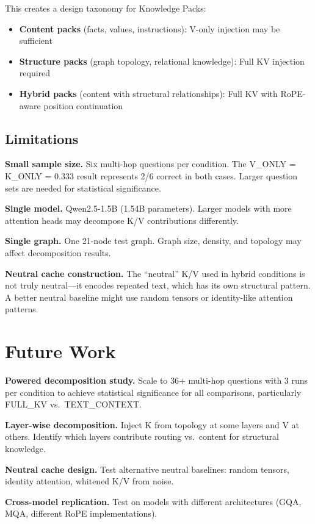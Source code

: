 \documentclass[11pt,a4paper]{article}
\begin{document}
This creates a design taxonomy for Knowledge Packs:
\begin{itemize}
    \item \textbf{Content packs} (facts, values, instructions): V-only injection may be sufficient
    \item \textbf{Structure packs} (graph topology, relational knowledge): Full KV injection required
    \item \textbf{Hybrid packs} (content with structural relationships): Full KV with RoPE-aware position continuation
\end{itemize}

\subsection{Limitations}

\textbf{Small sample size.} Six multi-hop questions per condition. The V\_ONLY = K\_ONLY = 0.333 result represents 2/6 correct in both cases. Larger question sets are needed for statistical significance.

\textbf{Single model.} Qwen2.5-1.5B (1.54B parameters). Larger models with more attention heads may decompose K/V contributions differently.

\textbf{Single graph.} One 21-node test graph. Graph size, density, and topology may affect decomposition results.

\textbf{Neutral cache construction.} The ``neutral'' K/V used in hybrid conditions is not truly neutral---it encodes repeated text, which has its own structural pattern. A better neutral baseline might use random tensors or identity-like attention patterns.

\section{Future Work}

\textbf{Powered decomposition study.} Scale to 36+ multi-hop questions with 3 runs per condition to achieve statistical significance for all comparisons, particularly FULL\_KV vs.\ TEXT\_CONTEXT.

\textbf{Layer-wise decomposition.} Inject K from topology at some layers and V at others. Identify which layers contribute routing vs.\ content for structural knowledge.

\textbf{Neutral cache design.} Test alternative neutral baselines: random tensors, identity attention, whitened K/V from noise.

\textbf{Cross-model replication.} Test on models with different architectures (GQA, MQA, different RoPE implementations).
\end{document}
